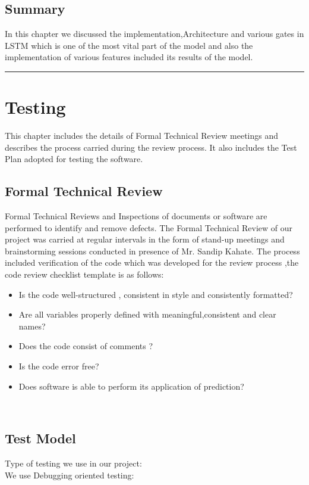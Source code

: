 \documentclass[openany,12pt]{report}
\begin{document}
{{{{{\section{Summary}
In this chapter we discussed the implementation,Architecture and various gates in LSTM which is one of the most vital part of the model and also the implementation of various features included its results of the model.\cite{paper1,paper3,paper6} 
\vfill
\hrule

\chapter{Testing}
This chapter includes the details of Formal Technical Review meetings and describes the process carried during the review process. It also includes the Test Plan adopted for testing the software.
\section{Formal Technical Review}
Formal Technical Reviews and Inspections of documents or software are performed to identify and
remove defects. The Formal Technical Review of our project was carried at regular intervals in the form of stand-up meetings and brainstorming sessions conducted in presence of Mr. Sandip Kahate. The process included verification of the code which was developed for the review process ,the code review  checklist template is as follows:

\begin{itemize}
\item{{Is the code well-structured , consistent in style and consistently formatted?}}
\item{{Are all variables properly defined with meaningful,consistent and clear names?}}
\item{{Does the code consist of comments ?}}
\item{{Is the code error free?}}
\item{{Does software is able to perform its application of prediction?}}
\end{itemize}

\\
\newpage
\section{Test Model}
 Type of testing we use in our project:
 \\
We use Debugging oriented testing:
\begin{itemize}


\end{itemize}}}}}}
\end{document}
